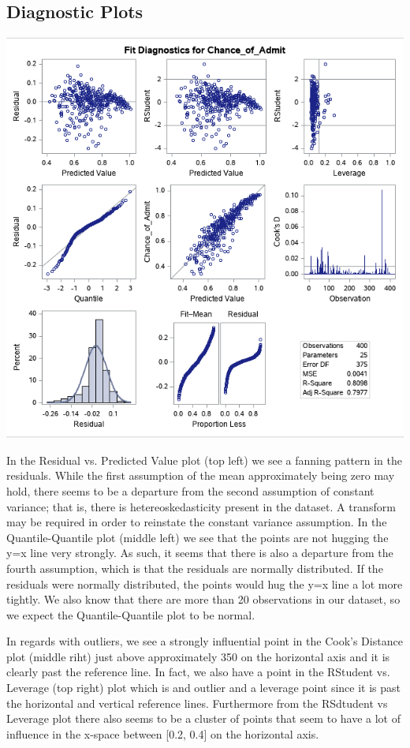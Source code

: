 \documentclass{article}
\begin{document}
\subsection*{Diagnostic Plots}

\includegraphics[scale=0.5]{Diagnostic_Plots.png}

In the Residual vs. Predicted Value plot (top left) we see a fanning pattern in the residuals. While the first assumption of the mean approximately being zero may hold, there seems to be a departure from the second assumption of constant variance; that is, there is hetereoskedasticity present in the dataset. A transform may be required in order to reinstate the constant variance assumption. In the Quantile-Quantile plot (middle left) we see that the points are not hugging the y=x line very strongly. As such, it seems that there is also a departure from the fourth assumption, which is that the residuals are normally distributed. If the residuals were normally distributed, the points would hug the y=x line a lot more tightly. We also know that there are more than 20 observations in our dataset, so we expect the Quantile-Quantile plot to be normal.

In regards with outliers, we see a strongly influential point in the Cook's Distance plot (middle riht) just above approximately 350 on the horizontal axis and it is clearly past the reference line. In fact, we also have a point in the RStudent vs. Leverage (top right) plot which is and outlier and a leverage point since it is past the horizontal and vertical reference lines. Furthermore from the RSdtudent vs Leverage plot there also seems to be a cluster of points that seem to have a lot of influence in the x-space between [0.2, 0.4] on the horizontal axis.
\end{document}
